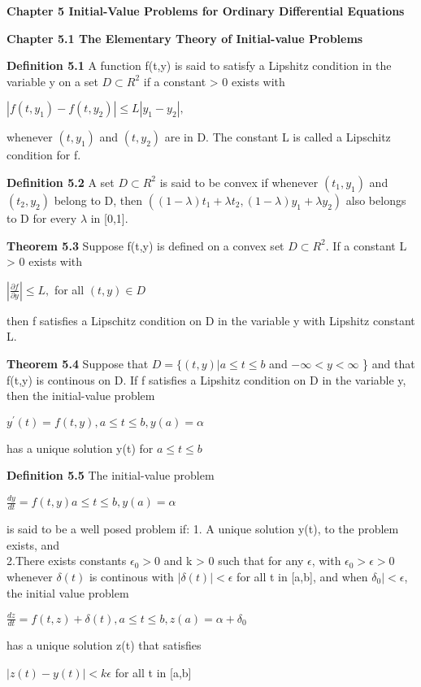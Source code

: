 \documentclass{article}
\begin{document}
\textbf {Chapter 5 Initial-Value Problems for Ordinary Differential Equations}

\textbf {Chapter 5.1 The Elementary Theory of Initial-value Problems}

\textbf {Definition 5.1} A function f(t,y) is said to satisfy a Lipshitz condition in the variable y on a set $D \subset R^2$ if a constant > 0 exists with
\begin{center}
$|f(t,y_1)-f(t,y_2)| \leq L |y_1 - y_2|,$
\end{center}
whenever $(t, y_1)$ and $(t, y_2)$ are in D. The constant L is called a Lipschitz condition for f.

\textbf {Definition 5.2} A set $D \subset R^2$ is said to be convex if whenever $(t_1, y_1)$ and $(t_2, y_2)$ belong to D, then $((1 - \lambda) t_1 + \lambda t_2, (1 - \lambda) y_1 + \lambda y_2)$ also belongs to D for every $\lambda$ in [0,1].

\textbf {Theorem 5.3} Suppose f(t,y) is defined on a convex set $D \subset R^2$. If a constant L > 0 exists with
\begin{center}
$|\frac{\partial f}{\partial y} | \leq L,$ for all $(t, y) \in D$
\end{center}
then f satisfies a Lipschitz condition on D in the variable y with Lipshitz constant L.

\textbf {Theorem 5.4} Suppose that $D = \{ (t,y) | a \leq t \leq b$ and $-\infty < y < \infty$ \} and that f(t,y) is continous on D. If f satisfies a Lipshitz condition on D in the variable y, then the initial-value problem
\begin{center}
$y^{'}(t) = f(t,y),   a \leq t \leq b,   y(a) = \alpha$
\end{center}
has a unique solution y(t) for $a \leq t \leq b$

\textbf {Definition 5.5} The initial-value problem 
\begin{center}
$ \frac{dy}{dt} = f(t,y) a \leq t \leq b, y(a) = \alpha$
\end{center}
is said to be a well posed problem if:
1. A unique solution y(t), to the problem exists, and \\
2.There exists constants $\epsilon_0 > 0$ and k > 0 such that for any $\epsilon$, with $\epsilon_0 > \epsilon > 0$ whenever $\delta (t)$ is continous with $|\delta(t)| < \epsilon$ for all t in [a,b], and when $\delta_0| < \epsilon$, the initial value problem
\begin{center}
$\frac{dz}{dt} = f(t,z) + \delta(t), a \leq t \leq b, z(a) = \alpha + \delta_0$
\end{center}
has a unique solution z(t) that satisfies 
\begin{center}
$|z(t) - y(t)| < k \epsilon$   for all t in [a,b]
\end{center}
\end{document}
